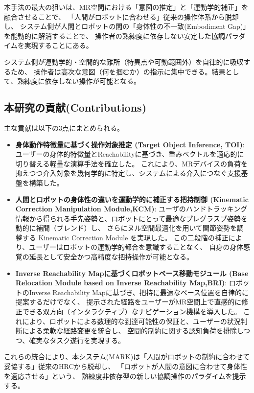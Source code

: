 \documentclass[../../main.tex]{subfiles} %
\begin{document}
本手法の最大の狙いは、MR空間における「意図の推定」と「運動学的補正」を融合させることで、
「人間がロボットに合わせる」従来の操作体系から脱却し、
システム側が人間とロボットの間の「身体性の不一致(Embodiment Gap)」を能動的に解消することで、
操作者の熟練度に依存しない安定した協調パラダイムを実現することにある。

システム側が運動学的・空間的な難所（特異点や可動範囲外）を自律的に吸収するため、
操作者は高次な意図（何を掴むか）の指示に集中できる。結果として、熟練度に依存しない操作が可能となる。

\subsection*{本研究の貢献(Contributions)}

主な貢献は以下の3点にまとめられる。

\begin{itemize}
  \item \textbf{身体動作特徴量に基づく操作対象推定 (Target Object Inference, TOI)}:
  ユーザーの身体的特徴量とReachabilityに基づき、重みベクトルを適応的に切り替える軽量な演算手法を確立した。
  これにより、MRデバイスの負荷を抑えつつ介入対象を幾何学的に特定し、システムによる介入につなぐ支援基盤を構築した。

  \item \textbf{人間とロボットの身体性の違いを運動学的に補正する把持制御 (Kinematic Correction Manipulation Module,KCM)}:
  ユーザのハンドトラッキング情報から得られる手先姿勢と、ロボットにとって最適なプレグラスプ姿勢を動的に補間（ブレンド）し、
  さらにヌル空間最適化を用いて関節姿勢を調整する Kinematic Correction Module を実現した。
  この二段階の補正により、ユーザーはロボットの運動学的都合を意識することなく、
  自身の身体感覚の延長として安全かつ高精度な把持操作が可能となる。

  \item \textbf{Inverse Reachability Mapに基づくロボットベース移動モジュール (Base Relocation Module based on Inverse Reachability Map,BRI)}:
  ロボットのInverse Reachability Mapに基づき、把持に最適なベース位置を自律的に提案するだけでなく、
  提示された経路をユーザーがMR空間上で直感的に修正できる双方向（インタラクティブ）なナビゲーション機構を導入した。
  これにより、ロボットによる数理的な到達可能性の保証と、ユーザーの状況判断による柔軟な経路変更を統合し、
  空間的制約に関する認知負荷を排除しつつ、確実なタスク遂行を実現する。
\end{itemize}

これらの統合により、本システム(MARK)は「人間がロボットの制約に合わせて妥協する」従来のHRCから脱却し、
「ロボットが人間の意図に合わせて身体性を適応させる」という、
熟練度非依存型の新しい協調操作のパラダイムを提示する。
\end{document}
